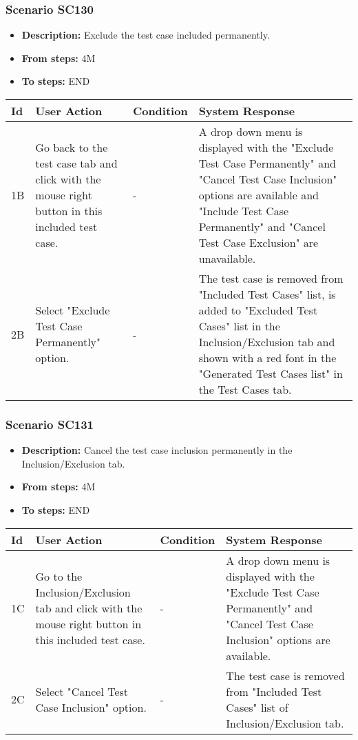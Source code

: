 \documentclass[a4paper,11pt]{article}
\newcommand{\bl}{\\ \hline}
\begin{document}
\subsubsection*{Scenario SC130}
\begin{itemize}
\item {\bf Description:} Exclude the test case included permanently.
				
\item {\bf From steps:} 4M
\item {\bf To steps:} END
\end{itemize}
\begin{tabular}{|p{0.4in}|p{1.5in}|p{1.5in}|p{1.5in}|}
\hline
Id & User Action & Condition & System Response \bl 
1B & Go back to the test case tab and click with the mouse right
						button in this included test case. & - & A drop down menu is displayed with the "Exclude Test Case
						Permanently" and "Cancel Test Case Inclusion" options are
						available and "Include Test Case Permanently" and "Cancel Test
						Case Exclusion" are unavailable.\bl
2B & Select "Exclude Test Case Permanently" option. & - & The test case is removed from "Included Test Cases" list,
						is added to "Excluded Test Cases" list in the Inclusion/Exclusion
						tab and shown with a red font in the "Generated Test Cases list"
						in the Test Cases tab.\bl
\end{tabular}
\subsubsection*{Scenario SC131}
\begin{itemize}
\item {\bf Description:} Cancel the test case inclusion permanently in the
					Inclusion/Exclusion tab.
\item {\bf From steps:} 4M
\item {\bf To steps:} END
\end{itemize}
\begin{tabular}{|p{0.4in}|p{1.5in}|p{1.5in}|p{1.5in}|}
\hline
Id & User Action & Condition & System Response \bl 
1C & Go to the Inclusion/Exclusion tab and click with the mouse
						right button in this included test case. & - & A drop down menu is displayed with the "Exclude Test Case
						Permanently" and "Cancel Test Case Inclusion" options are
						available. \bl
2C & Select "Cancel Test Case Inclusion" option. & - & The test case is removed from "Included Test Cases" list
						of Inclusion/Exclusion tab.\bl
\end{tabular}
\end{document}
